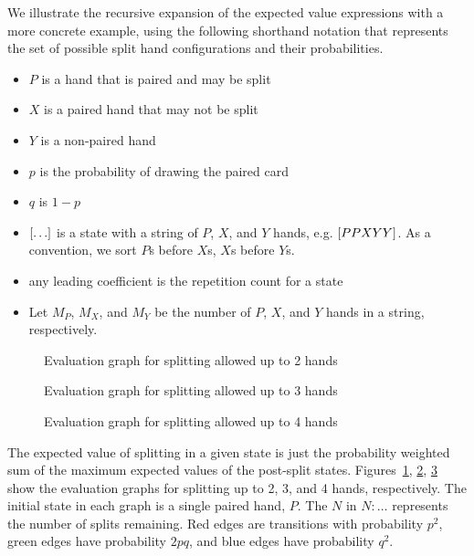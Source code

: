 We illustrate the recursive expansion of the expected value expressions 
with a more concrete example, 
using the following shorthand notation that represents the 
set of possible split hand configurations and their probabilities.

\begin{itemize}
\item $P$ is a hand that is paired and may be split
\item $X$ is a paired hand that may not be split
\item $Y$ is a non-paired hand
\item $p$ is the probability of drawing the paired card
\item $q$ is $1-p$
\item $\left[\ldots\right]$ is a state with a string of
$P$, $X$, and $Y$ hands, e.g. $\left[PPXYY\right]$.
As a convention, we sort $P$s before $X$s, $X$s before $Y$s.
\item any leading coefficient is the repetition count for a state
\item Let $M_P$, $M_X$, and $M_Y$ be the number of $P$, $X$, and $Y$
hands in a string, respectively.  
\end{itemize}

\begin{figure}[ht!]
\centerline{}
\caption{Evaluation graph for splitting allowed up to 2 hands}
\label{fig:split-2}
\end{figure}

\begin{figure}[ht!]
\centerline{}
\caption{Evaluation graph for splitting allowed up to 3 hands}
\label{fig:split-3}
\end{figure}

\begin{figure}[ht!]
\centerline{}
\caption{Evaluation graph for splitting allowed up to 4 hands}
\label{fig:split-4}
\end{figure}

\noindent
The expected value of splitting in a given state
is just the probability weighted sum of 
the maximum expected values of the post-split states. 
Figures~\ref{fig:split-2}, \ref{fig:split-3}, \ref{fig:split-4}
show the evaluation graphs
for splitting up to 2, 3, and 4 hands, respectively.  
The initial state in each graph is a single paired hand, $P$.  
The $N$ in $N:\ldots$ represents the number of splits remaining.
Red edges are transitions with probability $p^2$,
green edges have probability $2pq$,
and blue edges have probability $q^2$.

